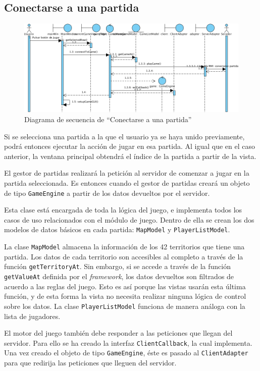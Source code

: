 \subsection{Conectarse a una partida}

\begin{figure}[ht]
\centering
\includegraphics[scale=0.6]{img/ch03devel-playgame.png}
\caption{Diagrama de secuencia de ``Conectarse a una partida''}
\end{figure}

Si se selecciona una partida a la que el usuario ya se haya unido previamente,
podrá entonces ejecutar la acción de jugar en esa partida. Al igual que en el
caso anterior, la ventana principal obtendrá el índice de la partida a partir
de la vista.

El gestor de partidas realizará la petición al servidor de comenzar a jugar en
la partida seleccionada. Es entonces cuando el gestor de partidas creará un
objeto de tipo \texttt{GameEngine} a partir de los datos devueltos por el
servidor.

Esta clase está encargada de toda la lógica del juego, e implementa todos los
casos de uso relacionados con el módulo de juego. Dentro de ella se crean los
dos modelos de datos básicos en cada partida: \texttt{MapModel} y
\texttt{PlayerListModel}.

La clase \texttt{MapModel} almacena la información de los 42 territorios que
tiene una partida. Los datos de cada territorio son accesibles al completo a
través de la función \texttt{getTerritoryAt}. Sin embargo, si se accede a través
de la función \texttt{getValueAt} definida por el \textit{framework}, los datos
devueltos son filtrados de acuerdo a las reglas del juego. Esto es así porque
las vistas usarán esta última función, y de esta forma la vista no necesita
realizar ninguna lógica de control sobre los datos. La clase
\texttt{PlayerListModel} funciona de manera análoga con la lista de jugadores.

El motor del juego también debe responder a las peticiones que llegan del
servidor. Para ello se ha creado la interfaz \texttt{ClientCallback}, la cual
implementa. Una vez creado el objeto de tipo \texttt{GameEngine}, éste es
pasado al \texttt{ClientAdapter} para que redirija las peticiones que lleguen
del servidor.

